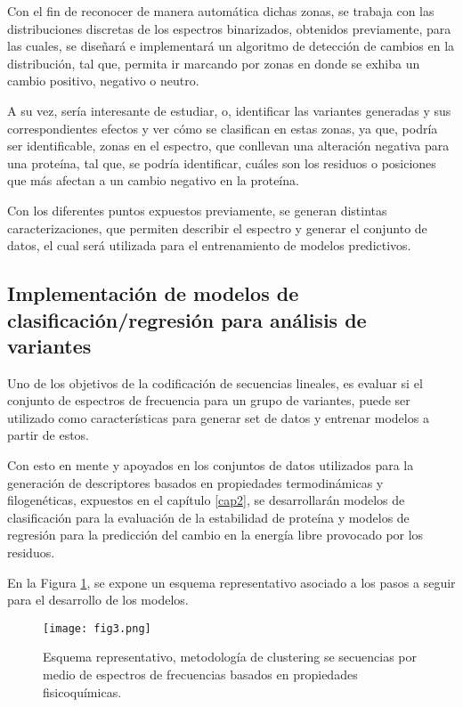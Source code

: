 Con el fin de reconocer de manera automática dichas zonas, se trabaja con las distribuciones discretas de los espectros binarizados, obtenidos previamente, para las cuales, se diseñará e implementará un algoritmo de detección de cambios en la distribución, tal que, permita ir marcando por zonas en donde se exhiba un cambio positivo, negativo o neutro. 

A su vez, sería interesante de estudiar, o, identificar las variantes generadas y sus correspondientes efectos y ver cómo se clasifican en estas zonas, ya que, podría ser identificable, zonas en el espectro, que conllevan una alteración negativa para una proteína, tal que, se podría identificar, cuáles son los residuos o posiciones que más afectan a un cambio negativo en la proteína. 

Con los diferentes puntos expuestos previamente, se generan distintas caracterizaciones, que permiten describir el espectro y generar el conjunto de datos, el cual será utilizada para el entrenamiento de modelos predictivos.

\subsection{Implementación de modelos de clasificación/regresión para análisis de variantes}

Uno de los objetivos de la codificación de secuencias lineales, es evaluar si el conjunto de espectros de frecuencia para un grupo de variantes, puede ser utilizado como características para generar set de datos y entrenar modelos a partir de estos.

Con esto en mente y apoyados en los conjuntos de datos utilizados para la generación de descriptores basados en propiedades termodinámicas y filogenéticas, expuestos en el capítulo \ref{cap2}, se desarrollarán modelos de clasificación para la evaluación de la estabilidad de proteína y modelos de regresión para la predicción del cambio en la energía libre provocado por los residuos.

En la Figura \ref{cap3:fig3}, se expone un esquema representativo asociado a los pasos a seguir para el desarrollo de los modelos.

\begin{figure}[!h]
	
	\centering
	\texttt{[image: fig3.png]}
	\caption{Esquema representativo, metodología de clustering se secuencias por medio de espectros de frecuencias basados en propiedades fisicoquímicas.}
	\label{cap3:fig3}
\end{figure}


